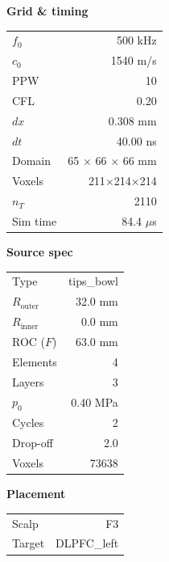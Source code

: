 \documentclass[11pt,letterpaper]{article}
\begin{document}
\begin{table}[h!]
\centering
\scriptsize
\setlength{\tabcolsep}{4pt}
\renewcommand{\arraystretch}{1.05}
\begin{minipage}[t]{0.32\linewidth}\centering
\textbf{Grid \& timing}\\[2pt]
\begin{tabular}{lr}
\toprule
$f_0$               & 500 kHz \\
$c_0$               & 1540 m/s \\
PPW                 & 10 \\
CFL                 & 0.20 \\
$dx$                & 0.308 mm \\
$dt$                & 40.00 ns \\
Domain              & 65 $\times$ 66 $\times$ 66 mm \\
Voxels              & 211$\times$214$\times$214 \\
$n_T$               & 2110 \\
Sim time            & 84.4 $\mu$s \\
\bottomrule
\end{tabular}
\end{minipage}\hfill
\begin{minipage}[t]{0.32\linewidth}\centering
\textbf{Source spec}\\[2pt]
\begin{tabular}{lr}
\toprule
Type             & tips\_bowl \\
$R_{\text{outer}}$ & 32.0 mm \\
$R_{\text{inner}}$ & 0.0 mm \\
ROC ($F$)        & 63.0 mm \\
Elements         & 4 \\
Layers           & 3 \\
$p_0$            & 0.40 MPa \\
Cycles           & 2 \\
Drop-off         & 2.0 \\
Voxels           & 73638 \\
\bottomrule
\end{tabular}
\end{minipage}\hfill
\begin{minipage}[t]{0.32\linewidth}\centering
\textbf{Placement}\\[2pt]
\begin{tabular}{lr}
\toprule
Scalp            & F3 \\
Target           & DLPFC\_left \\

\end{tabular}
\end{minipage}
\end{table}
\end{document}
